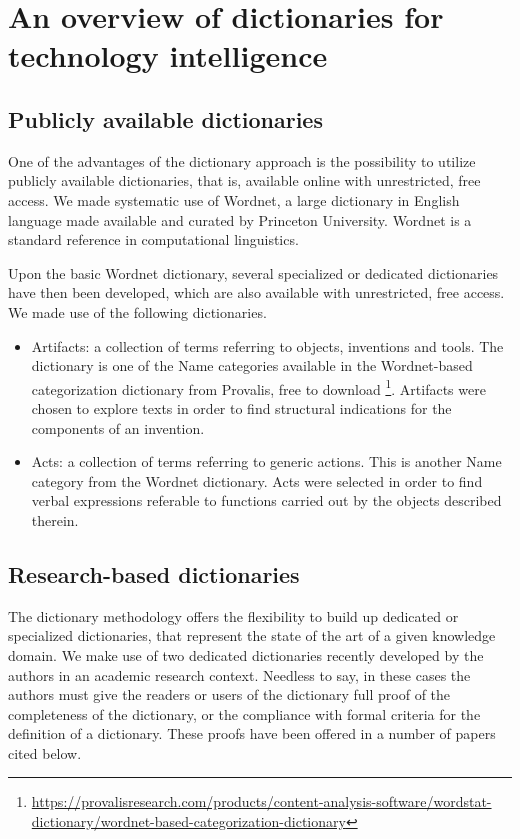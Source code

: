 \documentclass[b5paper,]{book}
\let\rmarkdownfootnote\footnote%
\def\footnote{\protect\rmarkdownfootnote}
\theoremstyle{definition}
\theoremstyle{definition}
\theoremstyle{definition}
\theoremstyle{remark}
\begin{document}
\section{An overview of dictionaries for technology
intelligence}\label{an-overview-of-dictionaries-for-technology-intelligence}

\subsection{Publicly available
dictionaries}\label{publicly-available-dictionaries}

One of the advantages of the dictionary approach is the possibility to
utilize publicly available dictionaries, that is, available online with
unrestricted, free access. We made systematic use of Wordnet, a large
dictionary in English language made available and curated by Princeton
University. Wordnet is a standard reference in computational
linguistics.

Upon the basic Wordnet dictionary, several specialized or dedicated
dictionaries have then been developed, which are also available with
unrestricted, free access. We made use of the following dictionaries.

\begin{itemize}
\item
  Artifacts: a collection of terms referring to objects, inventions and
  tools. The dictionary is one of the Name categories available in the
  Wordnet-based categorization dictionary from Provalis, free to
  download \footnote{\url{https://provalisresearch.com/products/content-analysis-software/wordstat-dictionary/wordnet-based-categorization-dictionary}}.
  Artifacts were chosen to explore texts in order to find structural
  indications for the components of an invention.
\item
  Acts: a collection of terms referring to generic actions. This is
  another Name category from the Wordnet dictionary. Acts were selected
  in order to find verbal expressions referable to functions carried out
  by the objects described therein.
\end{itemize}

\subsection{Research-based
dictionaries}\label{research-based-dictionaries}

The dictionary methodology offers the flexibility to build up dedicated
or specialized dictionaries, that represent the state of the art of a
given knowledge domain. We make use of two dedicated dictionaries
recently developed by the authors in an academic research context.
Needless to say, in these cases the authors must give the readers or
users of the dictionary full proof of the completeness of the
dictionary, or the compliance with formal criteria for the definition of
a dictionary. These proofs have been offered in a number of papers cited
below.
\end{document}
